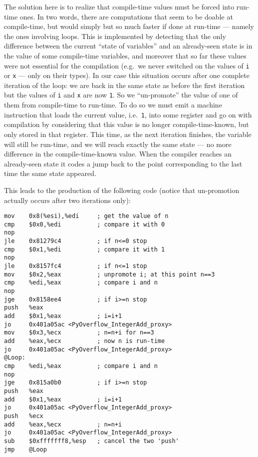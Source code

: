 \documentclass{article}
\def\code#1{\texttt{#1}}
\begin{document}
The solution here is to realize that compile-time values must be forced into run-time ones. In two words, there are computations that seem to be doable at compile-time, but would simply but so much faster if done at run-time --- namely the ones involving loops. This is implemented by detecting that the only difference between the current ``state of variables'' and an already-seen state is in the value of some compile-time variables, and moreover that so far these values were not essential for the compilation (e.g.\ we never switched on the values of \code{i} or \code{x} --- only on their types). In our case this situation occurs after one complete iteration of the loop: we are back in the same state as before the first iteration but the values of \code{i} and \code{x} are now \code{1}. So we ``un-promote'' the value of one of them from compile-time to run-time. To do so we must emit a machine instruction that loads the current value, i.e.\ \code{1}, into some register and go on with compilation by considering that this value is no longer compile-time-known, but only stored in that register. This time, as the next iteration finishes, the variable will still be run-time, and we will reach exactly the same state --- no more difference in the compile-time-known value. When the compiler reaches an already-seen state it codes a jump back to the point corresponding to the last time the same state appeared.

This leads to the production of the following code (notice that un-promotion actually occurs after two iterations only):

\begin{verbatim}
mov    0x8(%esi),%edi     ; get the value of n
cmp    $0x0,%edi          ; compare it with 0
nop    
jle    0x81279c4          ; if n<=0 stop
cmp    $0x1,%edi          ; compare it with 1
nop    
jle    0x8157fc4          ; if n<=1 stop
mov    $0x2,%eax          ; unpromote i; at this point n==3
cmp    %edi,%eax          ; compare i and n
nop    
jge    0x8158ee4          ; if i>=n stop
push   %eax
add    $0x1,%eax          ; i=i+1
jo     0x401a05ac <PyOverflow_IntegerAdd_proxy>
mov    $0x3,%ecx          ; n=n+i for n==3
add    %eax,%ecx          ; now n is run-time
jo     0x401a05ac <PyOverflow_IntegerAdd_proxy>
@Loop:
cmp    %edi,%eax          ; compare i and n
nop    
jge    0x815a0b0          ; if i>=n stop
push   %eax
add    $0x1,%eax          ; i=i+1
jo     0x401a05ac <PyOverflow_IntegerAdd_proxy>
push   %ecx
add    %eax,%ecx          ; n=n+i
jo     0x401a05ac <PyOverflow_IntegerAdd_proxy>
sub    $0xfffffff8,%esp   ; cancel the two 'push'
jmp    @Loop
\end{verbatim}
\end{document}
